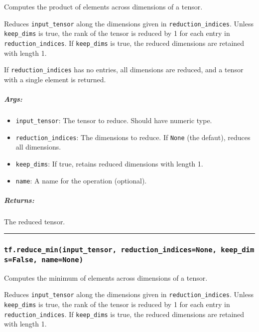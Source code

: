 Computes the product of elements across dimensions of a tensor.

Reduces \texttt{input\_tensor} along the dimensions given in
\texttt{reduction\_indices}. Unless \texttt{keep\_dims} is true, the
rank of the tensor is reduced by 1 for each entry in
\texttt{reduction\_indices}. If \texttt{keep\_dims} is true, the reduced
dimensions are retained with length 1.

If \texttt{reduction\_indices} has no entries, all dimensions are
reduced, and a tensor with a single element is returned.

\subparagraph{Args: }\label{args-39}

\begin{itemize}
\tightlist
\item
  \texttt{input\_tensor}: The tensor to reduce. Should have numeric
  type.
\item
  \texttt{reduction\_indices}: The dimensions to reduce. If
  \texttt{None} (the defaut), reduces all dimensions.
\item
  \texttt{keep\_dims}: If true, retains reduced dimensions with length
  1.
\item
  \texttt{name}: A name for the operation (optional).
\end{itemize}

\subparagraph{Returns: }\label{returns-39}

The reduced tensor.

\begin{center}\rule{0.5\linewidth}{\linethickness}\end{center}

\subsubsection{\texorpdfstring{\texttt{tf.reduce\_min(input\_tensor,\ reduction\_indices=None,\ keep\_dims=False,\ name=None)}
}{tf.reduce\_min(input\_tensor, reduction\_indices=None, keep\_dims=False, name=None) }}\label{tf.reduceux5fmininputux5ftensor-reductionux5findicesnone-keepux5fdimsfalse-namenone}

Computes the minimum of elements across dimensions of a tensor.

Reduces \texttt{input\_tensor} along the dimensions given in
\texttt{reduction\_indices}. Unless \texttt{keep\_dims} is true, the
rank of the tensor is reduced by 1 for each entry in
\texttt{reduction\_indices}. If \texttt{keep\_dims} is true, the reduced
dimensions are retained with length 1.

